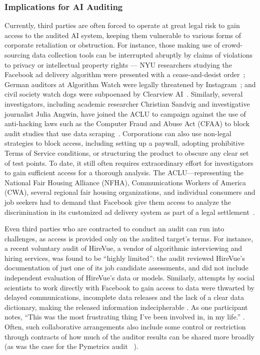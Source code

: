 \documentclass[sigconf]{acmart}
\begin{document}
\subsubsection{Implications for AI Auditing}
Currently, third parties are often forced to operate at great legal risk to gain access to the audited AI system, keeping them vulnerable to various forms of corporate retaliation or obstruction. For instance, those making use of crowd-sourcing data collection tools can be interrupted abruptly by claims of violations to privacy or intellectual property rights --- NYU researchers studying the Facebook ad delivery algorithm were presented with a cease-and-desist order~\cite{faceshutNYU}; German auditors at Algorithm Watch were legally threatened by Instagram~\cite{faceshutAW}; and civil society watch dogs were subpoenaed by Clearview AI~\cite{shutclearview}. Similarly, several investigators, including academic researcher Christian Sandvig and investigative journalist Julia Angwin, have joined the ACLU to campaign against the use of anti-hacking laws such as the Computer Fraud and Abuse Act (CFAA) to block audit studies that use data scraping~\cite{kadri2020digital, 2020sandvig, 2020van}. Corporations can also use non-legal strategies to block access, including setting up a paywall, adopting prohibitive Terms of Service conditions, or structuring the product to obscure any clear set of test points. To date, it still often requires extraordinary effort for investigators to gain sufficient access for a thorough analysis. The ACLU—representing the National Fair Housing Alliance (NFHA), Communications Workers of America (CWA), several regional fair housing organizations, and individual consumers and job seekers had to demand that Facebook give them access to analyze the discrimination in its customized ad delivery system as part of a legal settlement~\cite{sherwinfacebook}.

Even third parties who are contracted to conduct an audit can run into challenges, as access is provided only on the audited target's terms. For instance, a recent voluntary audit of HireVue, a vendor of algorithmic interviewing and hiring services, was found to be “highly limited”: the audit reviewed HireVue’s documentation of just one of its job candidate assessments, and did not include independent evaluation of HireVue’s data or models. Similarly, attempts by social scientists to work directly with Facebook to gain access to data were thwarted by delayed communications, incomplete data releases and the lack of a clear data dictionary, making the released information indecipherable \cite{fbpersily2018}. As one participant notes, “This was the most frustrating thing I've been involved in, in my life.'' \cite{lapowsky}. Often, such collaborative arrangements also include some control or restriction through contracts of how much of the auditor results can be shared more broadly (as was the case for the Pymetrics audit ~\cite{wilson2021building}).
\end{document}
